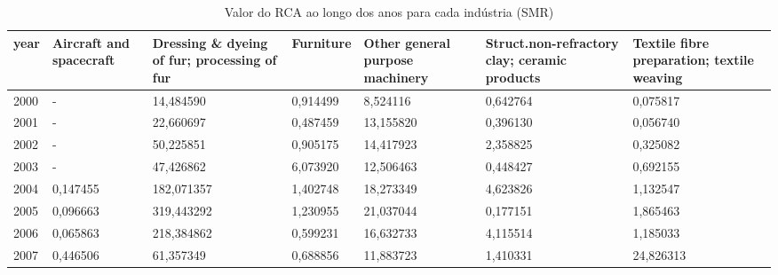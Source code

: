 \begin{table}
\centering
\caption{Valor do RCA ao longo dos anos para cada indústria (SMR)}
\begin{tabular}{p{1cm}p{2cm}p{2cm}p{2cm}p{2cm}p{2cm}p{2cm}}
\toprule
 year &  Aircraft and spacecraft &  Dressing \& dyeing of fur; processing of fur &  Furniture &  Other general purpose machinery &  Struct.non-refractory clay; ceramic products &  Textile fibre preparation; textile weaving \\
\midrule
 2000 &                        - &                                    14,484590 &   0,914499 &                         8,524116 &                                      0,642764 &                                    0,075817 \\
 2001 &                        - &                                    22,660697 &   0,487459 &                        13,155820 &                                      0,396130 &                                    0,056740 \\
 2002 &                        - &                                    50,225851 &   0,905175 &                        14,417923 &                                      2,358825 &                                    0,325082 \\
 2003 &                        - &                                    47,426862 &   6,073920 &                        12,506463 &                                      0,448427 &                                    0,692155 \\
 2004 &                 0,147455 &                                   182,071357 &   1,402748 &                        18,273349 &                                      4,623826 &                                    1,132547 \\
 2005 &                 0,096663 &                                   319,443292 &   1,230955 &                        21,037044 &                                      0,177151 &                                    1,865463 \\
 2006 &                 0,065863 &                                   218,384862 &   0,599231 &                        16,632733 &                                      4,115514 &                                    1,185033 \\
 2007 &                 0,446506 &                                    61,357349 &   0,688856 &                        11,883723 &                                      1,410331 &                                   24,826313 \\

\end{tabular}
\end{table}
